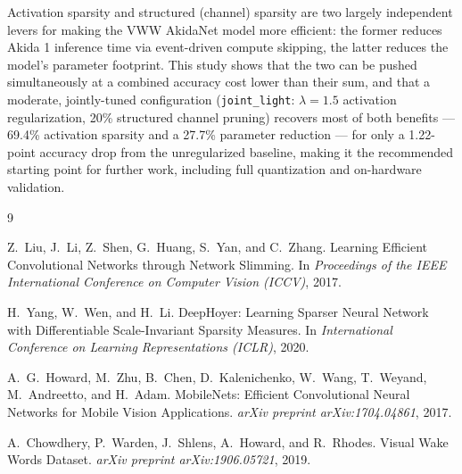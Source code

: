 \documentclass[11pt]{article}
\newcommand{\code}[1]{\texttt{#1}}
\begin{document}
Activation sparsity and structured (channel) sparsity are two largely independent levers for making the VWW AkidaNet model more efficient: the former reduces Akida 1 inference time via event-driven compute skipping, the latter reduces the model's parameter footprint. This study shows that the two can be pushed simultaneously at a combined accuracy cost lower than their sum, and that a moderate, jointly-tuned configuration (\code{joint\_light}: $\lambda=1.5$ activation regularization, 20\% structured channel pruning) recovers most of both benefits --- 69.4\% activation sparsity and a 27.7\% parameter reduction --- for only a 1.22-point accuracy drop from the unregularized baseline, making it the recommended starting point for further work, including full quantization and on-hardware validation.

\begin{thebibliography}{9}

Z.~Liu, J.~Li, Z.~Shen, G.~Huang, S.~Yan, and C.~Zhang.
\newblock Learning Efficient Convolutional Networks through Network Slimming.
\newblock In \emph{Proceedings of the IEEE International Conference on Computer Vision (ICCV)}, 2017.

H.~Yang, W.~Wen, and H.~Li.
\newblock DeepHoyer: Learning Sparser Neural Network with Differentiable Scale-Invariant Sparsity Measures.
\newblock In \emph{International Conference on Learning Representations (ICLR)}, 2020.

A.~G.~Howard, M.~Zhu, B.~Chen, D.~Kalenichenko, W.~Wang, T.~Weyand, M.~Andreetto, and H.~Adam.
\newblock MobileNets: Efficient Convolutional Neural Networks for Mobile Vision Applications.
\newblock \emph{arXiv preprint arXiv:1704.04861}, 2017.

A.~Chowdhery, P.~Warden, J.~Shlens, A.~Howard, and R.~Rhodes.
\newblock Visual Wake Words Dataset.
\newblock \emph{arXiv preprint arXiv:1906.05721}, 2019.

\end{thebibliography}
\end{document}
